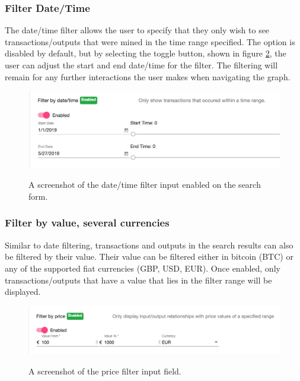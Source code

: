 \subsubsection{Filter Date/Time}
The date/time filter allows the user to specify that they only wish to see transactions/outputs that were mined in the time range specified. The option is disabled by default, but by selecting the toggle button, shown in figure \ref{fig:date-time-filter}, the user can adjust the start and end date/time for the filter. The filtering will remain for any further interactions the user makes when navigating the graph. 

\begin{figure}[h!]
  \centering
  \includegraphics[width = 15cm]{./figures/ui-screenshots/date-time-filter}\\[0.5cm] 
  \caption{A screenshot of the date/time filter input enabled on the search form.}
  \label{fig:date-time-filter}
\end{figure}

\subsubsection{Filter by value, several currencies}
Similar to date filtering, transactions and outputs in the search results can also be filtered by their value. Their value can be filtered either in bitcoin (BTC) or any of the supported fiat currencies (GBP, USD, EUR). Once enabled, only transactions/outputs that have a value that lies in the filter range will be displayed. 

\begin{figure}[h!]
  \centering
  \includegraphics[width = 15cm]{./figures/ui-screenshots/price-filter-form}\\[0.5cm] 
  \caption{A screenshot of the price filter input field.}
  \label{fig:date-time-filter}
\end{figure}

